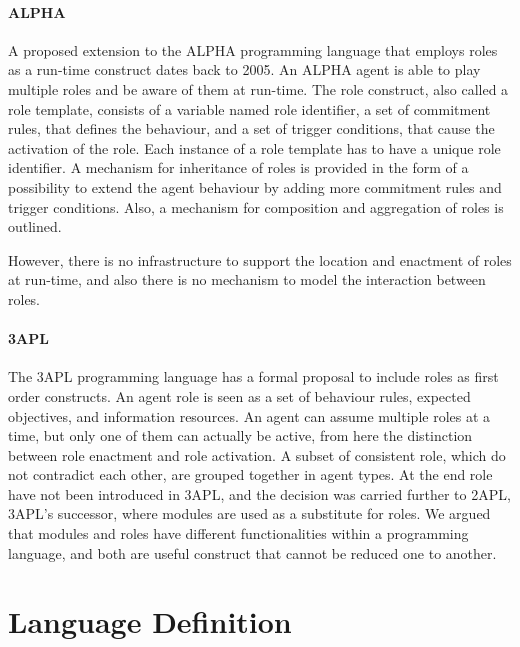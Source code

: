 \documentclass[a4paper,12pt,oneside,fleqn]{book} %
\begin{document}
\subsubsection{ALPHA} %
A proposed extension to the ALPHA programming language that employs roles
as a run-time construct dates back to 2005\cite{Collier_arole-based}. An
ALPHA agent is able to play multiple roles and be aware of them at
run-time. The role construct, also called a role template, consists of a
variable named role identifier, a set of commitment rules, that defines the
behaviour, and a set of trigger conditions, that cause the activation of
the role. Each instance of a role template has to have a unique role
identifier. A mechanism for inheritance of roles is provided in the form of
a possibility to  extend the agent behaviour by adding more commitment
rules and trigger conditions.  Also, a mechanism for composition and
aggregation of roles is outlined.

However, there is no infrastructure to support the location and enactment
of roles at run-time, and also there is no mechanism to model the
interaction between roles.

\subsubsection{3APL} %
The 3APL programming language\cite{DBLP:conf/aose/DastaniRHDM04} has a
formal proposal to include roles as first order constructs. An agent role
is seen as a set of behaviour rules, expected objectives, and information
resources. An agent can assume multiple roles at a time, but only one of
them can actually be active, from here the distinction between role
enactment and role activation. A subset of consistent role, which do not
contradict each other, are grouped together in agent types. At the end role
have not been introduced in 3APL, and the decision was carried further to
2APL\cite{DBLP:journals/aamas/Dastani08}, 3APL's successor, where modules
are used as a substitute for roles. We argued that modules and roles have
different functionalities within a programming language, and both are
useful construct that cannot be reduced one to another.

\chapter{Language Definition}\label{ch:langdef} %
\end{document}
